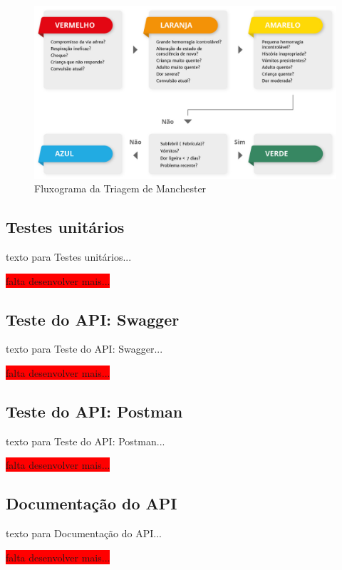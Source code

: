 \begin{figure}[htb]
	\centering
	\includegraphics[width=0.9\linewidth]{img/Codigo-Cores-Atendimento-Sistema-Triagem-Manchester.jpg}  %
	\caption{Fluxograma da Triagem de Manchester}
	\label{fig:ccasTriagenManchester}
\end{figure}



\subsection{Testes unitários}


texto para Testes unitários...
 
\colorbox{red}{\Large falta desenvolver mais...}


\subsection{Teste do API: Swagger}


texto para Teste do API: Swagger...
 
\colorbox{red}{\Large falta desenvolver mais...}


\subsection{Teste do API: Postman}


texto para Teste do API: Postman...
 
\colorbox{red}{\Large falta desenvolver mais...}



\subsection{Documentação do API}


texto para Documentação do API...
 
\colorbox{red}{\Large falta desenvolver mais...}


